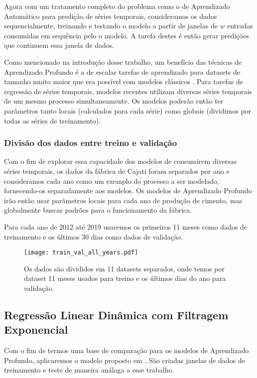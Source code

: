 Agora com um tratamento completo do problema como o de Aprendizado Automático para predição de séries
temporais, consideramos os dados sequencialmente, treinando e testando o modelo a partir de janelas de $w$
entradas consumidas em sequência pelo o modelo. A tarefa destes é então gerar
predições que continuem essa janela de dados. 

Como mencionado na introdução desse trabalho, um benefício das técnicas de
Aprendizado Profundo é a de escalar tarefas de aprendizado para datasets de
tamanho muito maior que era possível com modelos clássicos \citep{dlbook}.
Para tarefas de regressão de séries temporais, modelos recentes utilizam
diversas séries temporais de um mesmo processo simultaneamente.
Os modelos poderão então ter parâmetros tanto locais (calculados
para cada série) como globais (dividimos por todas as séries de treinamento).

\subsubsection{Divisão dos dados entre treino e validação}

Com o fim de explorar essa capacidade dos modelos de consumirem diversas séries
temporais, os dados da fábrica de Cajati foram separados por ano e consideramos
cada ano como um exemplo do processo a ser modelado, fornecendo-os separadamente
aos modelos. Os modelos de Aprendizado
Profundo irão então usar parâmetros locais para cada ano de produção de cimento,
mas globalmente buscar padrões para o funcionamento da fábrica. 

Para cada ano de 2012 até 2019 usaremos os primeiros 11 meses como dados de
treinamento e os últimos 30 dias como dados de validação.


\begin{figure}[H]
  \centering
  \texttt{[image: train\_val\_all\_years.pdf]} 
  \caption{Os dados são divididos em 11 datasets separados, onde temos por
    dataset 11 meses usados para treino e os últimos dias do ano para validação.} 
  \label{fig:trainvalallyears}
\end{figure}

\subsection{Regressão Linear Dinâmica com Filtragem Exponencial}

Com o fim de termos uma base de comparação para os modelos de
Aprendizado Profundo, aplicaremos o modelo proposto em \citep{grecialin}.
São criadas janelas de dados de treinamento e teste de maneira análoga a esse trabalho.

